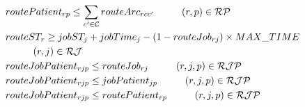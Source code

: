 \begin{align}
		& routePatient_{rp} \le \sum_{c' \in \mathcal{C}} routeArc_{rcc'}
				\hspace{10mm} (r, p) \in \mathcal{RP} \label{eq:routepatient3}\\
		& routeST_{r} \ge jobST_{j} + jobTime_{j} - (1 - routeJob_{rj}) \times MAX\_TIME \notag\\ 
				&	\hspace{10mm} (r, j) \in \mathcal{RJ} \label{eq:routejob}\\
		& routeJobPatient_{rjp} \le routeJob_{rj}	
				\hspace{10mm} (r, j, p) \in \mathcal{RJP} \label{eq:auxBinary4}\\
		& routeJobPatient_{rjp} \le jobPatient_{jp}
				\hspace{10mm} (r, j, p) \in \mathcal{RJP} \label{eq:auxBinary5}\\
		& routeJobPatient_{rjp} \le routePatient_{rp}
				\hspace{10mm} (r, j, p) \in \mathcal{RJP} \label{eq:auxBinary6}
\end{align}